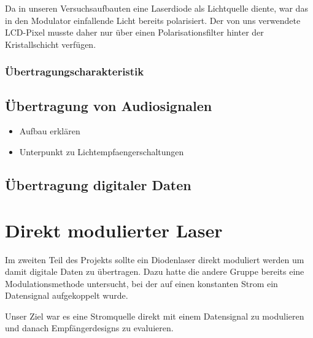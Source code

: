\documentclass[12pt,a4paper]{article}
\begin{document}
Da in unseren Versuchsaufbauten eine Laserdiode als Lichtquelle diente, war das in den Modulator einfallende Licht bereits polarisiert. Der von uns verwendete LCD-Pixel musste daher nur über einen Polarisationsfilter hinter der Kristallschicht verfügen.

\subsubsection{Übertragungscharakteristik}





\subsection{Übertragung von Audiosignalen}
\begin{itemize}
\item Aufbau erklären
\item Unterpunkt zu Lichtempfaengerschaltungen
\end{itemize}

\subsection{Übertragung digitaler Daten}






\section{Direkt modulierter Laser}
Im zweiten Teil des Projekts sollte ein Diodenlaser direkt moduliert werden um damit digitale Daten zu übertragen. Dazu hatte die andere Gruppe bereits eine Modulationsmethode untersucht, bei der auf einen konstanten Strom ein Datensignal aufgekoppelt wurde.

Unser Ziel war es eine Stromquelle direkt mit einem Datensignal zu modulieren und danach Empfängerdesigns zu evaluieren.
\end{document}
